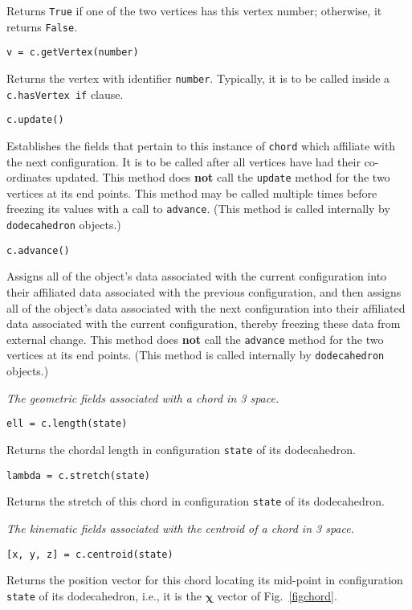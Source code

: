 \medskip\noindent
Returns \texttt{True} if one of the two vertices has this vertex number; otherwise, it returns \texttt{False}.

\medskip\noindent
\texttt{v = c.getVertex(number)}

\medskip\noindent
Returns the vertex with identifier \texttt{number}.  Typically, it is to be called inside a \texttt{c.hasVertex if} clause.

\medskip\noindent
\texttt{c.update()}

\medskip\noindent
Establishes the fields that pertain to this instance of \texttt{chord} which affiliate with the next configuration.  It is to be called after all vertices
have had their co-ordinates updated.  This method does \textbf{not} call the \texttt{update} method for the two vertices at its end points.  This method may be called multiple times before freezing its values with a call to \texttt{advance}.  (This method is called internally by \texttt{dodecahedron} objects.)

\newpage
\medskip\noindent
\texttt{c.advance()}

\medskip\noindent
Assigns all of the object's data associated with the current configuration into their affiliated data associated with the previous configuration, and then assigns all of the object's data associated with the next configuration into their affiliated data associated with the current configuration, thereby freezing these data from external change.  This method does \textbf{not} call the \texttt{advance} method for the two vertices at its end points. (This method is called internally by \texttt{dodecahedron} objects.)

\medskip\noindent
\textit{The geometric fields associated with a chord in 3 space.}

\medskip\noindent
\texttt{ell = c.length(state)}

\medskip\noindent
Returns the chordal length in configuration \texttt{state} of its dodecahedron.

\medskip\noindent
\texttt{lambda = c.stretch(state)}

\medskip\noindent
Returns the stretch of this chord in configuration \texttt{state} of its dodecahedron.

\medskip\noindent
\textit{The kinematic fields associated with the centroid of a chord in 3 space.}

\medskip\noindent
\texttt{[x, y, z] = c.centroid(state)}

\medskip\noindent
Returns the position vector for this chord locating its mid-point in configuration \texttt{state} of its dodecahedron, i.e., it is the $\boldsymbol{\chi}$ vector of Fig.~\ref{figchord}.

